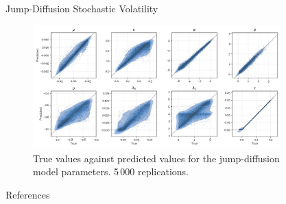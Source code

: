 \documentclass[final]{beamer}
\newlength{\sepwidth}
\newlength{\colwidth}
\newlength{\colwidthlarge}
\newcommand{\separatorcolumn}{\begin{column}{\sepwidth}\end{column}}
\begin{document}
\begin{frame}[t]
\begin{columns}[t]
\begin{column}{\colwidthlarge}
\begin{block}{Jump-Diffusion Stochastic Volatility}
      \begin{figure}\label{fig:results}
        \centering
        \includegraphics[width=\textwidth]{img/preds_poster.pdf}\vspace{-1em}
        \caption{True values against predicted values for the jump-diffusion model parameters. 5\,000 replications.}
      \end{figure}  

      \end{block}\vspace{-1em}

    
      \begin{block}{References}
        \printbibliography
      \end{block}
    

      
      

      
    \end{column}
    
    \separatorcolumn
    
    \begin{column}{\colwidth}
      
    \end{column}
    
    \separatorcolumn
    \end{columns}
    \end{frame}
\end{document}
